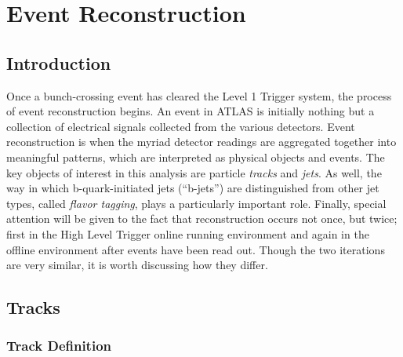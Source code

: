 \chapter{Event Reconstruction} \label{chapter:reconstruction}

    \section{Introduction}

        Once a bunch-crossing event has cleared the Level 1 Trigger system, the process of event reconstruction begins.
        An event in ATLAS is initially nothing but a collection of electrical signals collected from the various detectors.
        Event reconstruction is when the myriad detector readings are aggregated together into meaningful patterns,
            which are interpreted as physical objects and events.
        The key objects of interest in this analysis are particle \textit{tracks} and \textit{jets}.
        As well, the way in which b-quark-initiated jets (``b-jets'') are distinguished from other jet types,
            called \textit{flavor tagging}, plays a particularly important role.
        Finally, special attention will be given to the fact that reconstruction occurs not once, but twice;
            first in the High Level Trigger online running environment
            and again in the offline environment after events have been read out.
        Though the two iterations are very similar, it is worth discussing how they differ.

    \FloatBarrier
    \section{Tracks} \label{sec:reco_tracks}
            
        \subsection{Track Definition}
            
